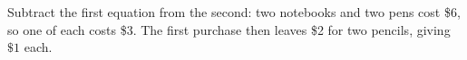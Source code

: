 Subtract the first equation from the second: two notebooks and two pens cost \$6, so one of each costs \$3. The first purchase then leaves \$2 for two pencils, giving $\boxed{\$1}$ each.
